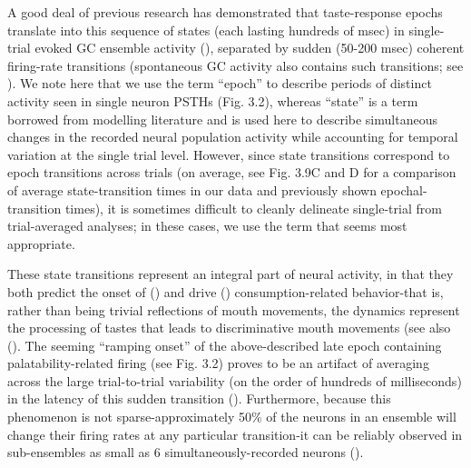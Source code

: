 \begin{refsection}
A good deal of previous research has demonstrated that taste-response epochs translate into this sequence of states (each lasting hundreds of msec) in single-trial evoked GC ensemble activity (\cite{jones2007a,sadacca2016a,mukherjee2019a}), separated by sudden (50-200 msec) coherent firing-rate transitions (spontaneous GC activity also contains such transitions; see \cite{camera2019a,mazzucato2015a}). We note here that we use the term “epoch” to describe periods of distinct activity seen in single neuron PSTHs (Fig. 3.2), whereas “state” is a term borrowed from modelling literature and is used here to describe simultaneous changes in the recorded neural population activity while accounting for temporal variation at the single trial level. However, since state transitions correspond to epoch transitions across trials (on average, see Fig. 3.9C and D for a comparison of average state-transition times in our data and previously shown epochal-transition times), it is sometimes difficult to cleanly delineate single-trial from trial-averaged analyses; in these cases, we use the term that seems most appropriate.

These state transitions represent an integral part of neural activity, in that they both predict the onset of (\cite{sadacca2016a}) and drive (\cite{mukherjee2019a}) consumption-related behavior-that is, rather than being trivial reflections of mouth movements, the dynamics represent the processing of tastes that leads to discriminative mouth movements (see also (\cite{jones2007a,katz2001a}). The seeming “ramping onset” of the above-described late epoch containing palatability-related firing (see Fig. 3.2) proves to be an artifact of averaging across the large trial-to-trial variability (on the order of hundreds of milliseconds) in the latency of this sudden transition (\cite{jones2007a,sadacca2016a}). Furthermore, because this phenomenon is not sparse-approximately 50\% of the neurons in an ensemble will change their firing rates at any particular transition-it can be reliably observed in sub-ensembles as small as 6 simultaneously-recorded neurons (\cite{jones2007a}). 


\end{refsection}
